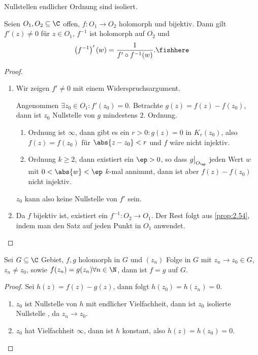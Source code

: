 \begin{cor}
\label{prop:2.56}
Nullstellen endlicher Ordnung sind isoliert.\fishhere
\end{cor}

\begin{prop}
\label{prop:2.57}
Seien $O_1,O_2\subseteq \C$ offen, $f: O_1\to O_2$ holomorph und bijektiv. Dann
gilt $f'(z)\neq 0$ für $z\in O_1$, $f^{-1}$ ist holomorph auf $O_2$ und
\begin{align*}
\left(f^{-1}\right)'(w) = \frac{1}{f'\circ f^{-1}(w)}.\fishhere
\end{align*}
\end{prop}
\begin{proof}
\begin{enumerate}[label=\arabic{*}.)]
  \item Wir zeigen $f' \neq 0$ mit einem Widerspruchsargument.
  
  Angenommen $\exists z_0\in O_1 : f'(z_0) = 0$. Betrachte $g(z) =
  f(z)-f(z_0)$, dann ist $z_0$ Nullstelle von $g$ mindestens $2$. Ordnung.
  \begin{enumerate}[label=Fall \alph{*})]
    \item Ordnung ist $\infty$, dann gibt es ein $r > 0: g(z) = 0$ in
    $K_r(z_0)$, also $f(z) = f(z_0)$ für $\abs{z-z_0}<r$ und $f$ wäre nicht
    injektiv.
    \item Ordnung $k\ge 2$, dann existiert ein $\ep > 0$, so dass
    $g\big|_{O_{\ep}}$ jeden Wert $w$ mit $0<\abs{w}<\ep$ $k$-mal annimmt, dann
    ist aber $f(z)-f(z_0)$ nicht injektiv.
  \end{enumerate}
  
  $z_0$ kann also keine Nullstelle von $f'$ sein.
  \item Da $f$ bijektiv ist, existiert ein $f^{-1} : O_2\to O_1$. Der Rest
  folgt aus \ref{prop:2.54}, indem man den Satz auf jeden Punkt in $O_1$
  anwendet.\qedhere
    \end{enumerate}
\end{proof}

\begin{prop}[Identitätssatz]
\label{prop:2.58}
Sei $G\subseteq \C$ Gebiet, $f,g$ holomorph in $G$ und $(z_n)$ Folge in $G$ mit
$z_n\to z_0\in G$, $z_n\neq z_0$, sowie $f(z_n)=g(z_n)
\forall n\in\N$, dann ist $f=g$ auf $G$.\fishhere
\end{prop}
\begin{proof}
Sei $h(z) = f(z)-g(z)$, dann folgt $h(z_0) = h(z_n) = 0$.
\begin{enumerate}[label=Fall \alph{*})]
  \item $z_0$ ist Nullstelle von $h$ mit endlicher Vielfachheit, dann ist $z_0$
  isolierte Nullstelle \dipper, da $z_n\to z_0$.
  \item $z_0$ hat Vielfachheit $\infty$, dann ist $h$ konstant, also $h(z) =
  h(z_0) = 0$.\qedhere
\end{enumerate}
\end{proof}

